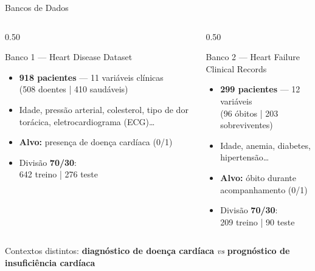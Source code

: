 \documentclass[aspectratio=169,11pt,brazil]{beamer}
\begin{document}
\begin{frame}{Bancos de Dados}
  \begin{columns}[T]
    \begin{column}{0.50\textwidth}
      \begin{block}{Banco 1 — Heart Disease Dataset}
        \begin{itemize}
          \item \textbf{918 pacientes} — 11 variáveis clínicas\\
                (508 doentes | 410 saudáveis)
          \item Idade, pressão arterial, colesterol, tipo de dor torácica, eletrocardiograma (ECG)\ldots
          \item \textbf{Alvo:} presença de doença cardíaca (0/1)
          \item Divisão \textbf{70/30}:\\
                642 treino | 276 teste
        \end{itemize}
      \end{block}
    \end{column}
    \begin{column}{0.50\textwidth}
      \begin{block}{Banco 2 — Heart Failure Clinical Records}
        \begin{itemize}
          \item \textbf{299 pacientes} — 12 variáveis\\
                (96 óbitos | 203 sobreviventes)
          \item Idade, anemia, diabetes, hipertensão\ldots
          \item \textbf{Alvo:} óbito durante acompanhamento (0/1)
          \item Divisão \textbf{70/30}:\\
                209 treino | 90 teste
        \end{itemize}
      \end{block}
    \end{column}
  \end{columns}
  \vfill
  \centering\small
  Contextos distintos: \textbf{diagnóstico de doença cardíaca} \textit{vs} \textbf{prognóstico de insuficiência cardíaca}
\end{frame}
\end{document}
